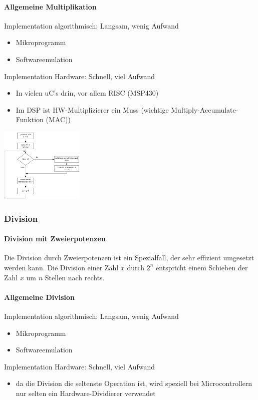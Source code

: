 \paragraph{Allgemeine Multiplikation}
\begin{multicols}{2}
	Implementation algorithmisch: Langsam, wenig Aufwand
	\begin{itemize}
		\item Mikroprogramm
		\item Softwareemulation
	\end{itemize}
	Implementation Hardware: Schnell, viel Aufwand
	\begin{itemize}
		\item In vielen uC's drin, vor allem RISC (MSP430)
		\item Im DSP ist HW-Multiplizierer ein Muss (wichtige Multiply-Accumulate-Funktion (MAC))
	\end{itemize}
	\columnbreak
	\includegraphics[width=0.3\textwidth]{images/Arithmetik/Ganzzahlig_Multiplikation}
\end{multicols}

\subsubsection{Division}
\paragraph {Division mit Zweierpotenzen}
Die Division durch Zweierpotenzen ist ein Spezialfall, der sehr effizient umgesetzt werden kann. Die Division einer Zahl $x$ durch $2^n$ entspricht einem Schieben der Zahl $x$ um $n$ Stellen nach rechts.

\paragraph {Allgemeine Division}
Implementation algorithmisch: Langsam, wenig Aufwand
\begin{itemize}
	\item Mikroprogramm
	\item Softwareemulation
\end{itemize}
Implementation Hardware: Schnell, viel Aufwand
\begin{itemize}
	\item da die Division die seltenste Operation ist, wird speziell bei Microcontrollern nur selten ein Hardware-Dividierer verwendet
\end{itemize}

